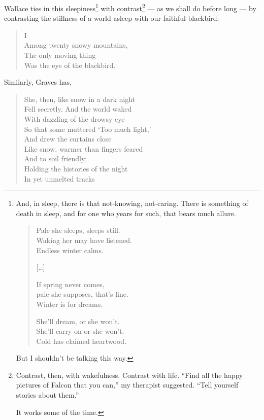 \documentclass[12pt,oneside]{memoir}
\begin{document}
Wallace ties in this sleepiness\footnote{And, in sleep, there is that not-knowing, not-caring. There is something of death in sleep, and for one who years for such, that bears much allure.\begin{verse}
Pale she sleeps, sleeps still. \\
Waking her may have listened. \\
Endless winter calms. \par
{[\ldots]} \par
If spring never comes, \\
pale she supposes, that's fine. \\
Winter is for dreams. \par
She'll dream, or she won't. \\
She'll carry on or she won't. \\
Cold has claimed heartwood. \par
\parencite{pale_she}
\end{verse}\par But I shouldn't be talking this way.} with contrast\footnote{Contrast, then, with wakefulness. Contrast with life. ``Find all the happy pictures of Falcon that you can,'' my therapist suggested. ``Tell yourself stories about them.''\par It works some of the time.} --- as we shall do before long --- by contrasting the stillness of a world asleep with our faithful blackbird:

\begin{verse}
I \\
Among twenty snowy mountains, \\
The only moving thing \\
Was the eye of the blackbird.

\parencite{blackbird}
\end{verse}

Similarly, Graves has,

\begin{verse}
She, then, like snow in a dark night \\
Fell secretly. And the world waked \\
With dazzling of the drowsy eye \\
So that some muttered `Too much light,' \\
And drew the curtains close \\
Like snow, warmer than fingers feared \\
And to soil friendly; \\
Holding the histories of the night \\
In yet unmelted tracks

\parencite[143]{graves_poems}
\end{verse}
\end{document}
